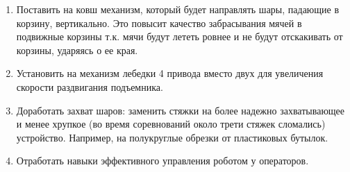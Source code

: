 \begin{enumerate}
\begin{enumerate}
  	\item Поставить на ковш механизм, который будет направлять шары, падающие в корзину, вертикально. Это повысит качество забрасывания мячей в подвижные корзины т.к. мячи будут лететь ровнее и не будут отскакивать от корзины, ударяясь о ее края.
  	
  	\item Установить на механизм лебедки 4 привода вместо двух для увеличения скорости раздвигания подъемника.
  	
  	\item Доработать захват шаров: заменить стяжки на более надежно захватывающее и менее хрупкое (во время соревнований около трети стяжек сломались) устройство. Например, на полукруглые обрезки от пластиковых бутылок.
  	
  	\item Отработать навыки эффективного управления роботом у операторов.
  	
  \end{enumerate}
  
\end{enumerate}
\fillpage